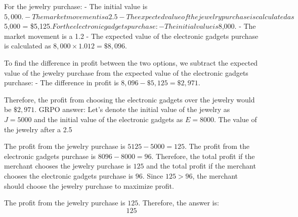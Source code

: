 \documentclass[11pt]{article}
\begin{document}
\begin{answerbox}
For the jewelry purchase:
- The initial value is $5,000.
- The market movement is a 2.5%
- The expected value of the jewelry purchase is calculated as $5,000  = \$5,125$.

For the electronic gadgets purchase:
- The initial value is $8,000.
- The market movement is a 1.2%
- The expected value of the electronic gadgets purchase is calculated as $8,000 \times 1.012 = \$8,096$.

To find the difference in profit between the two options, we subtract the expected value of the jewelry purchase from the expected value of the electronic gadgets purchase:
- The difference in profit is $8,096 - \$5,125 = \$2,971$.

Therefore, the profit from choosing the electronic gadgets over the jewelry would be $\boxed{\$2,971}$.
GRPO answer:
Let's denote the initial value of the jewelry as \( J = 5000 \) and the initial value of the electronic gadgets as \( E = 8000 \). The value of the jewelry after a 2.5%

The profit from the jewelry purchase is \( 5125 - 5000 = 125 \). The profit from the electronic gadgets purchase is \( 8096 - 8000 = 96 \). Therefore, the total profit if the merchant chooses the jewelry purchase is \( 125 \) and the total profit if the merchant chooses the electronic gadgets purchase is \( 96 \). Since \( 125 > 96 \), the merchant should choose the jewelry purchase to maximize profit.

The profit from the jewelry purchase is \( 125 \). Therefore, the answer is:
\[
\boxed{125}
\]
\end{answerbox}
\end{document}
